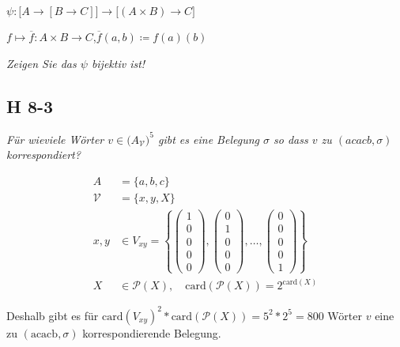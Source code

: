 \documentclass{scrartcl}
\begin{document}
$\psi : \big[ A \rightarrow [ B \rightarrow C ] \big]  \longrightarrow \big[ ( A \times B ) \rightarrow C \big]$

$f \mapsto \overline{f} : A \times B \rightarrow C $,\quad$\overline{f}(a, b) \coloneqq f(a)(b)$

\textsl{Zeigen Sie das $\psi$ bijektiv ist!}

\subsection{H 8-3}

\textsl{Für wieviele Wörter $v \in \big(A_\mathcal{V}\big)^5$ gibt es eine Belegung $\sigma$ so dass $v$ zu $(acacb, \sigma)$ korrespondiert?}

\begin{align*}
A &= \big\{ a,b,c \big\}\\
\mathcal{V} &= \big\{ x, y, X \big\}\\
x,y &\in V_{xy} = \left\{\begin{pmatrix}1\\0\\0\\0\\0\end{pmatrix}, \begin{pmatrix}0\\1\\0\\0\\0\end{pmatrix}, \ldots, \begin{pmatrix}0\\0\\0\\0\\1\end{pmatrix} \right\}\\
X &\in \mathcal{P}(X),\quad\text{card}(\mathcal{P}(X)) = 2^{\text{card}(X)}
\end{align*}

Deshalb gibt es für $\text{card}(V_{xy})^2 * \text{card}(\mathcal{P}(X)) = 5^2 * 2^5 = 800$
Wörter $v$ eine zu $(\text{acacb}, \sigma)$ korrespondierende Belegung.
\end{document}
